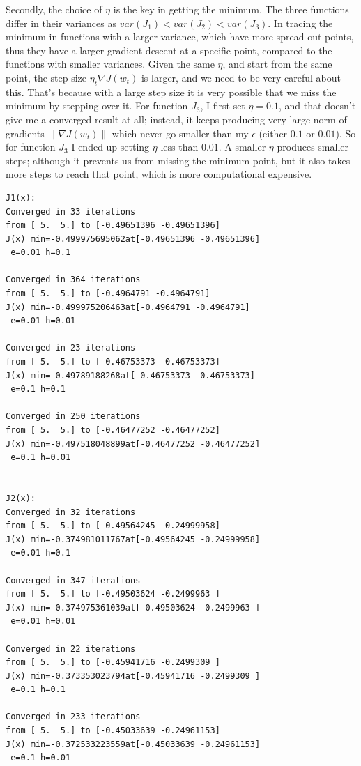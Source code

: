 \begin{itemize}
Secondly, the choice of $\eta$ is the key in getting the minimum. The three functions differ in their variances as $var(J_1)<var(J_2)<var(J_3)$. In tracing the minimum in functions with a larger variance, which have more spread-out points, thus they have a larger gradient descent at a specific point, compared to the functions with smaller variances. Given the same $\eta$, and start from the same point, the step size $\eta_t \nabla J(w_t)$ is larger, and we need to be very careful about this. That's because with a large step size it is very possible that we miss the minimum by stepping over it. For function $J_3$, I first set $\eta=0.1$, and that doesn't give me a converged result at all; instead, it keeps producing very large norm of gradients $\|\nabla J(w_t) \| $ which never go smaller than my $\epsilon$ (either $0.1$ or $0.01$). So for function $J_3$ I ended up setting $\eta$ less than $0.01$. A smaller $\eta$ produces smaller steps; although it prevents us from missing the minimum point, but it also takes more steps to reach that point, which is more computational expensive. 

\begin{verbatim}
J1(x):
Converged in 33 iterations
from [ 5.  5.] to [-0.49651396 -0.49651396]
J(x) min=-0.499975695062at[-0.49651396 -0.49651396]
 e=0.01 h=0.1
 
Converged in 364 iterations
from [ 5.  5.] to [-0.4964791 -0.4964791]
J(x) min=-0.499975206463at[-0.4964791 -0.4964791]
 e=0.01 h=0.01
 
Converged in 23 iterations
from [ 5.  5.] to [-0.46753373 -0.46753373]
J(x) min=-0.49789188268at[-0.46753373 -0.46753373]
 e=0.1 h=0.1
 
Converged in 250 iterations
from [ 5.  5.] to [-0.46477252 -0.46477252]
J(x) min=-0.497518048899at[-0.46477252 -0.46477252]
 e=0.1 h=0.01
 
 
J2(x):
Converged in 32 iterations
from [ 5.  5.] to [-0.49564245 -0.24999958]
J(x) min=-0.374981011767at[-0.49564245 -0.24999958]
 e=0.01 h=0.1
 
Converged in 347 iterations
from [ 5.  5.] to [-0.49503624 -0.2499963 ]
J(x) min=-0.374975361039at[-0.49503624 -0.2499963 ]
 e=0.01 h=0.01

Converged in 22 iterations
from [ 5.  5.] to [-0.45941716 -0.2499309 ]
J(x) min=-0.373353023794at[-0.45941716 -0.2499309 ]
 e=0.1 h=0.1

Converged in 233 iterations
from [ 5.  5.] to [-0.45033639 -0.24961153]
J(x) min=-0.372533223559at[-0.45033639 -0.24961153]
 e=0.1 h=0.01



\end{verbatim}
\end{itemize}
